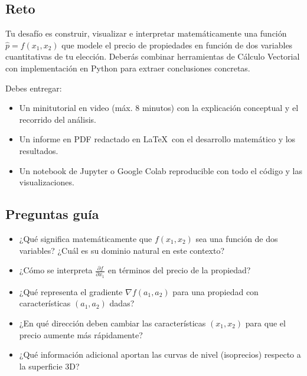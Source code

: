 \documentclass[a4,11pt]{aleph-notas}
\begin{document}
\subsection*{Reto}

Tu desafío es construir, visualizar e interpretar matemáticamente una función $\hat{p} = f(x_1, x_2)$ que modele el precio de propiedades en función de dos variables cuantitativas de tu elección. Deberás combinar herramientas de Cálculo Vectorial con implementación en Python para extraer conclusiones concretas.

Debes entregar:
\begin{itemize}[leftmargin=*]
    \item Un minitutorial en video (máx. 8 minutos) con la explicación conceptual y el recorrido del análisis.
    \item Un informe en PDF redactado en \LaTeX\ con el desarrollo matemático y los resultados.
    \item Un notebook de Jupyter o Google Colab reproducible con todo el código y las visualizaciones.
\end{itemize}

\subsection*{Preguntas guía}
\begin{itemize}[leftmargin=*]
    \item ¿Qué significa matemáticamente que $f(x_1, x_2)$ sea una función de dos variables? ¿Cuál es su dominio natural en este contexto?
    \item ¿Cómo se interpreta $\frac{\partial f}{\partial x_1}$ en términos del precio de la propiedad?
    \item ¿Qué representa el gradiente $\nabla f(a_1, a_2)$ para una propiedad con características $(a_1, a_2)$ dadas?
    \item ¿En qué dirección deben cambiar las características $(x_1, x_2)$ para que el precio aumente más rápidamente?
    \item ¿Qué información adicional aportan las curvas de nivel (isoprecios) respecto a la superficie 3D?
\end{itemize}
\end{document}
